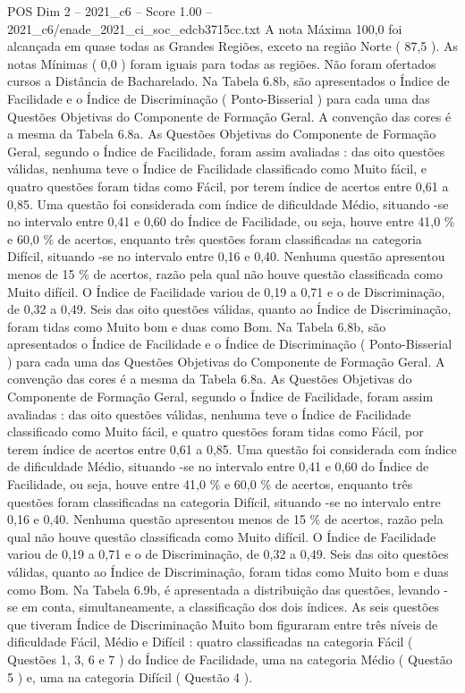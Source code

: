 \begin{textsample}{POS Dim 2 – 2021\_c6 – Score 1.00 – 2021\_c6/enade\_2021\_ci\_soc\_edcb3715cc.txt}
A nota Máxima 100,0 foi alcançada em quase todas as Grandes Regiões, exceto na região Norte ( 87,5 ).
As notas Mínimas ( 0,0 ) foram iguais para todas as regiões.
Não foram ofertados cursos a Distância de Bacharelado.
Na Tabela 6.8b, são apresentados o Índice de Facilidade e o Índice de Discriminação ( Ponto-Bisserial ) para cada uma das Questões Objetivas do Componente de Formação Geral.
A convenção das cores é a mesma da Tabela 6.8a.
As Questões Objetivas do Componente de Formação Geral, segundo o Índice de Facilidade, foram assim avaliadas : das oito questões válidas, nenhuma teve o Índice de Facilidade classificado como Muito fácil, e quatro questões foram tidas como Fácil, por terem índice de acertos entre 0,61 a 0,85.
Uma questão foi considerada com índice de dificuldade Médio, situando -se no intervalo entre 0,41 e 0,60 do Índice de Facilidade, ou seja, houve entre 41,0 \% e 60,0 \% de acertos, enquanto três questões foram classificadas na categoria Difícil, situando -se no intervalo entre 0,16 e 0,40.
Nenhuma questão apresentou menos de 15 \% de acertos, razão pela qual não houve questão classificada como Muito difícil.
O Índice de Facilidade variou de 0,19 a 0,71 e o de Discriminação, de 0,32 a 0,49.
Seis das oito questões válidas, quanto ao Índice de Discriminação, foram tidas como Muito bom e duas como Bom.
Na Tabela 6.8b, são apresentados o Índice de Facilidade e o Índice de Discriminação ( Ponto-Bisserial ) para cada uma das Questões Objetivas do Componente de Formação Geral.
A convenção das cores é a mesma da Tabela 6.8a.
As Questões Objetivas do Componente de Formação Geral, segundo o Índice de Facilidade, foram assim avaliadas : das oito questões válidas, nenhuma teve o Índice de Facilidade classificado como Muito fácil, e quatro questões foram tidas como Fácil, por terem índice de acertos entre 0,61 a 0,85.
Uma questão foi considerada com índice de dificuldade Médio, situando -se no intervalo entre 0,41 e 0,60 do Índice de Facilidade, ou seja, houve entre 41,0 \% e 60,0 \% de acertos, enquanto três questões foram classificadas na categoria Difícil, situando -se no intervalo entre 0,16 e 0,40.
Nenhuma questão apresentou menos de 15 \% de acertos, razão pela qual não houve questão classificada como Muito difícil.
O Índice de Facilidade variou de 0,19 a 0,71 e o de Discriminação, de 0,32 a 0,49.
Seis das oito questões válidas, quanto ao Índice de Discriminação, foram tidas como Muito bom e duas como Bom.
Na Tabela 6.9b, é apresentada a distribuição das questões, levando -se em conta, simultaneamente, a classificação dos dois índices.
As seis questões que tiveram Índice de Discriminação Muito bom figuraram entre três níveis de dificuldade Fácil, Médio e Difícil : quatro classificadas na categoria Fácil ( Questões 1, 3, 6 e 7 ) do Índice de Facilidade, uma na categoria Médio ( Questão 5 ) e, uma na categoria Difícil ( Questão 4 ).

\end{textsample}

